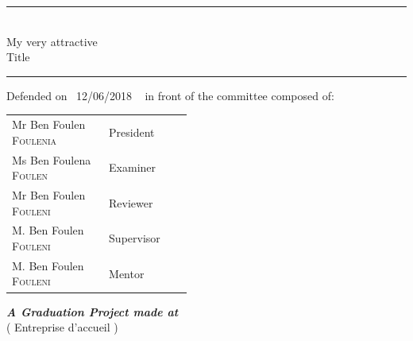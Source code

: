 \documentclass[a4paper, oneside, english, 12pt, final]{extreport}
\newcommand{\reportSubject} {%
  My very attractive \\ Title%
}
\newcommand{\dateSoutenance} {%
  12/06/2018%
}
\newcommand{\studyDepartment} {%
  Entreprise d'accueil %
}
\newcommand{\juryPresident} {%
  Mr Ben Foulen \textsc{Foulenia}%
}
\newcommand{\juryPresidentDesc} {%
  President%
}
\newcommand{\juryMemberOne} {%
  Ms Ben Foulena \textsc{Foulen}%
}
\newcommand{\juryMemberOneDesc} {%
  Examiner %
}
\newcommand{\juryMemberTwo} {%
  Mr Ben Foulen \textsc{Fouleni}%
}
\newcommand{\juryMemberTwoDesc} {%
  Reviewer%
}
\newcommand{\juryMemberThree} {%
	M. Ben Foulen \textsc{Fouleni}%
}
\newcommand{\juryMemberThreeDesc} {%
	Supervisor%
}
\newcommand{\juryMemberFour} {%
	M. Ben Foulen \textsc{Fouleni}%
}
\newcommand{\juryMemberFourDesc} {%
	Mentor%
}
\begin{document}
\begin{titlepage}
\begin{center}
\vspace{10pt} {%
  \renewcommand*{\familydefault}{\defaultFont}
  \fontsize{27pt}{27pt}\selectfont%
  \rule{0.5\textwidth}{.4pt}\\
  \vspace{10pt}
  \reportSubject{}\\%
  \vspace{10pt}
  \rule{0.5\textwidth}{.4pt}
}

\vspace{10pt}
Defended on~\dateSoutenance~ in front of the committee composed of:\\
\vspace{20pt}
\begin{tabular}{p{0.3\linewidth} p{0.15\linewidth}}
  \juryPresident{} & \juryPresidentDesc{}\\
  \juryMemberOne{} & \juryMemberOneDesc{}\\
  \juryMemberTwo{} & \juryMemberTwoDesc{}\\
  \juryMemberThree{} & \juryMemberThreeDesc{}\\
  \juryMemberFour{} & \juryMemberFourDesc{}\\
\end{tabular}

\vspace{10pt}%
\textbf{\textit{A Graduation Project made at}}\\

\vspace{10pt}
(\studyDepartment)\\

\end{center}
\end{titlepage}

\end{document}
